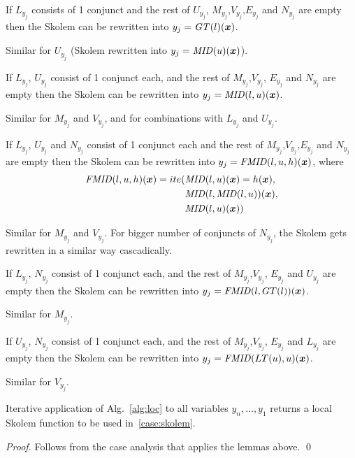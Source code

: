 \begin{lemma}
If $L_{y_j}$ consists of 1 conjunct and the rest of $U_{y_j}$, $M_{y_j} $,$V_{y_j}$,$E_{y_j}$ and $N_{y_j}$ are empty then the Skolem can be rewritten into $y_j = \mathit{GT} (l)(\vx)$.
\end{lemma}
Similar for $U_{y_j}$ (Skolem  rewritten into $y_j = \mathit{MID} (u)(\vx)$).

\begin{lemma}
If $L_{y_j}$, $U_{y_j}$  consist of 1 conjunct each, and the rest of $M_{y_j} $,$V_{y_j}$, $E_{y_j}$ and $N_{y_j}$ are empty then the Skolem can be rewritten into $y_j = \mathit{MID} (l, u)(\vx)$. 
\end{lemma}
Similar for $M_{y_j}$ and $V_{y_j}$, and for combinations with $L_{y_j}$ and $U_{y_j}$.


\begin{lemma}
If $L_{y_j}$, $U_{y_j}$ and $N_{y_j}$ consist of 1 conjunct each and the rest of $M_{y_j} $,$V_{y_j}$,$E_{y_j}$ and $N_{y_j}$ are empty then the Skolem can be rewritten into $y_j = \mathit{FMID} (l, u, h)(\vx)$, where%
\begin{align}
\mathit{FMID}(l, u, h) (\vx) = ite (&\mathit{MID}(l, u) (\vx) = h(\vx),  \notag \\
                          &\mathit{MID}(l, \mathit{MID}(l, u)) (\vx), \notag \\
                          &\mathit{MID}(l, u) (\vx)) \notag 
\end{align}
\end{lemma}
Similar for $M_{y_j}$ and $V_{y_j}$. 
For bigger number of conjuncts of $N_{y_j}$, the Skolem gets rewritten
in a similar way cascadically.


\begin{lemma}
If $L_{y_j}$, $N_{y_j}$  consist of 1 conjunct each, and the rest of $M_{y_j} $,$V_{y_j}$, $E_{y_j}$ and $U_{y_j}$ are empty then the Skolem can be rewritten into $y_j = \mathit{FMID} (l, GT(l))(\vx)$. 
\end{lemma}
Similar for $M_{y_j}$.


\begin{lemma}
If $U_{y_j}$, $N_{y_j}$  consist of 1 conjunct each, and the rest of $M_{y_j} $,$V_{y_j}$, $E_{y_j}$ and $L_{y_j}$ are empty then the Skolem can be rewritten into $y_j = \mathit{FMID} (LT(u), u)(\vx)$. 
\end{lemma}
Similar for $V_{y_j}$.


\begin{theorem}[Soundness]
Iterative application of Alg.~\ref{alg:loc} to all variables $y_n,\ldots,y_1$ returns a local Skolem function to be used in~\eqref{case:skolem}.
\end{theorem}
\begin{proof}
Follows from the case analysis that applies the lemmas above.
\qed
\end{proof}

